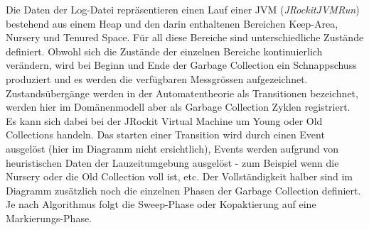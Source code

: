 Die Daten der Log-Datei repräsentieren einen Lauf einer JVM (\textit{JRockitJVMRun}) bestehend aus einem Heap und den darin enthaltenen Bereichen Keep-Area, Nursery und Tenured Space. Für all diese Bereiche sind unterschiedliche Zustände definiert. Obwohl sich die Zustände der einzelnen Bereiche kontinuierlich verändern, wird bei Beginn und Ende der Garbage Collection ein Schnappschuss produziert und es werden die verfügbaren Messgrössen aufgezeichnet. Zustandsübergänge werden in der Automatentheorie als Transitionen bezeichnet, werden hier im Domänenmodell aber als Garbage Collection Zyklen 
registriert. Es kann sich dabei bei der JRockit Virtual Machine um Young oder Old Collections handeln. Das starten einer Transition wird durch einen Event ausgelöst (hier im Diagramm nicht ersichtlich), Events werden aufgrund von heuristischen Daten der Lauzeitumgebung ausgelöst - zum Beispiel wenn die Nursery oder die Old Collection voll ist, etc. Der Vollständigkeit halber sind im Diagramm zusätzlich noch die einzelnen Phasen der Garbage Collection definiert. Je nach Algorithmus folgt die Sweep-Phase oder Kopaktierung auf eine Markierungs-Phase.


